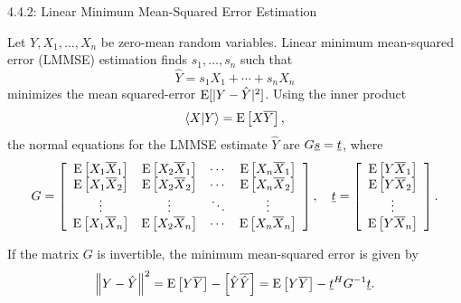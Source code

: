 \documentclass[10pt,letterpaper,english]{beamer}
\begin{document}
\begin{frame}{4.4.2: Linear Minimum Mean-Squared Error Estimation}

Let $Y, X_1, \ldots, X_n$ be zero-mean random variables.
Linear minimum mean-squared error (LMMSE) estimation finds $s_1, \ldots, s_n$ such that
\[ \hat{Y} = s_1 X_1 + \cdots + s_n X_n \]
minimizes the mean squared-error $\mathrm{E}[|Y-\hat{Y}|^2]$.
Using the inner product
\begin{equation*}
\left\langle X | Y \right\rangle = \mathrm{E} \left[ X \overline{Y} \right],
\end{equation*}
the normal equations for the LMMSE estimate $\hat{Y}$ are $G \underline{s} = \underline{t}$, where
\begin{equation*}
G = \left[ \begin{array}{cccc}
\mathrm{E} \left[ X_1 \overline{X}_1 \right]
& \mathrm{E} \left[ X_2 \overline{X}_1 \right] & \cdots
& \mathrm{E} \left[ X_n \overline{X}_1 \right] \\
\mathrm{E} \left[ X_1 \overline{X}_2 \right]
& \mathrm{E} \left[ X_2 \overline{X}_2 \right] & \cdots
& \mathrm{E} \left[ X_n \overline{X}_2 \right] \\
\vdots & \vdots & \ddots & \vdots \\
\mathrm{E} \left[ X_1 \overline{X}_n \right]
& \mathrm{E} \left[ X_2 \overline{X}_n \right] & \cdots
& \mathrm{E} \left[ X_n \overline{X}_n \right] \\
\end{array} \right], \quad \underline{t} = \left[ \begin{array}{c}
\mathrm{E} \left[ Y \overline{X}_1 \right] \\
\mathrm{E} \left[ Y \overline{X}_2 \right] \\ \vdots \\
\mathrm{E} \left[ Y \overline{X}_n \right] \end{array} \right].
\end{equation*}

If the matrix $G$ is invertible, the minimum mean-squared error is given by
\begin{equation*}
\left\| Y - \hat{Y} \right\|^2 = \mathrm{E} \left[ Y \overline{Y} \right]
- \left[ \hat{Y} \overline{\hat{Y}} \right] = \mathrm{E} \left[ Y \overline{Y} \right] - \underline{t}^H G^{-1} \underline{t} .
\end{equation*}

\end{frame}
\end{document}
